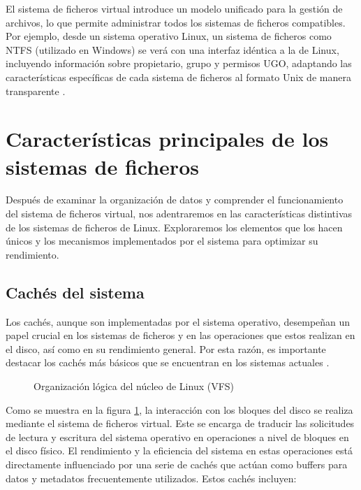 El sistema de ficheros virtual introduce un modelo unificado para la gestión de archivos, lo que permite administrar todos los sistemas de ficheros compatibles. Por ejemplo, desde un sistema operativo Linux, un sistema de ficheros como NTFS (utilizado en Windows) se verá con una interfaz idéntica a la de Linux, incluyendo información sobre propietario, grupo y permisos UGO, adaptando las características específicas de cada sistema de ficheros al formato Unix de manera transparente \cite{love2010,tanenbaum2014}.

\section{Características principales de los sistemas de ficheros}\label{sec:caracteristicas_principales_sistemas_ficheros}

Después de examinar la organización de datos y comprender el funcionamiento del sistema de ficheros virtual, nos adentraremos en las características distintivas de los sistemas de ficheros de Linux. Exploraremos los elementos que los hacen únicos y los mecanismos implementados por el sistema para optimizar su rendimiento.

\subsection{Cachés del sistema} 

Los cachés, aunque son implementadas por el sistema operativo, desempeñan un papel crucial en los sistemas de ficheros y en las operaciones que estos realizan en el disco, así como en su rendimiento general. Por esta razón, es importante destacar los cachés más básicos que se encuentran en los sistemas actuales \cite{valero2006,bovet2005}.


\begin{figure}[!ht]
    \centering
    \caption{Organización lógica del núcleo de Linux (VFS)}
    \label{fig:logica_organizacion_disco}
\end{figure}

Como se muestra en la figura \ref{fig:logica_organizacion_disco}, la interacción con los bloques del disco se realiza mediante el sistema de ficheros virtual. Este se encarga de traducir las solicitudes de lectura y escritura del sistema operativo en operaciones a nivel de bloques en el disco físico. El rendimiento y la eficiencia del sistema en estas operaciones está directamente influenciado por una serie de cachés que actúan como buffers para datos y metadatos frecuentemente utilizados. Estos cachés incluyen: 

